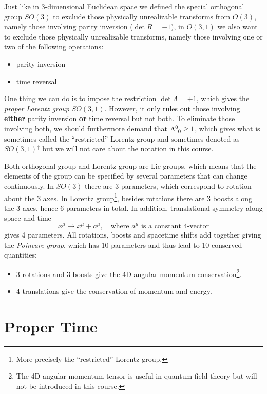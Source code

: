 \documentclass[11pt]{article}
\begin{document}
Just like in 3-dimensional Euclidean space we defined the special orthogonal group $SO(3)$ to exclude those physically unrealizable transforms from $O(3)$, namely those involving parity inversion ($\det R=-1$), in $O(3,1)$ we also want to exclude those physically unrealizable transforms, namely those involving one or two of the following operations:
\begin{itemize}
    \item parity inversion
    \item time reversal
\end{itemize}
One thing we can do is to impose the restriction $\det\Lambda=+1$, which gives the \textit{proper Lorentz group} $SO(3,1)$. However, it only rules out those involving \textbf{either} parity inversion \textbf{or} time reversal but not both. To eliminate those involving both, we should furthermore demand that $\tensor{\Lambda}{^0_0}\geq1$, which gives what is sometimes called the ``restricted'' Lorentz group and sometimes denoted as $SO(3,1)^\uparrow$ but we will not care about the notation in this course.

Both orthogonal group and Lorentz group are Lie groups, which means that the elements of the group can be specified by several parameters that can change continuously. In $SO(3)$ there are 3 parameters, which correspond to rotation about the 3 axes. In Lorentz group\footnote{More precisely the ``restricted'' Lorentz group.}, besides rotations there are 3 boosts along the 3 axes, hence 6 parameters in total. In addition, translational symmetry along space and time
\[
    x^\mu\rightarrow x^\mu+a^\mu,\quad\text{where $a^\mu$ is a constant 4-vector}
\]
gives 4 parameters. All rotations, boosts and spacetime shifts add together giving the \textit{Poincare group}, which has 10 parameters and thus lead to 10 conserved quantities:
\begin{itemize}
    \item 3 rotations and 3 boosts give the 4D-angular momentum conservation\footnote{The 4D-angular momentum tensor is useful in quantum field theory but will not be introduced in this course.}.
    \item 4 translations give the conservation of momentum and energy.
\end{itemize}

\section{Proper Time}
\end{document}

